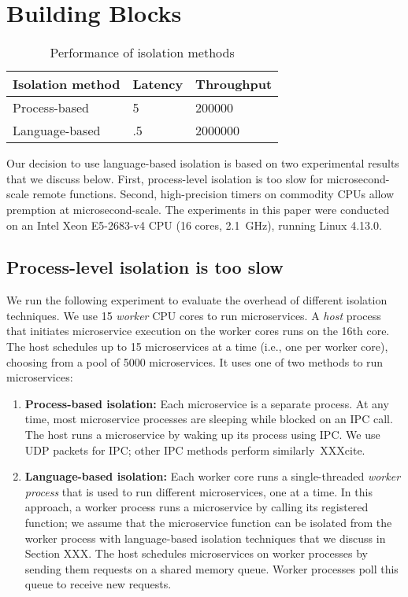 \section{Building Blocks}
\label{sec:motive}

\begin{table}
\begin{center}
\small
\begin{tabular}{lll}
\textbf{Isolation method} & \textbf{Latency} & \textbf{Throughput} \\
\midrule
Process-based & 5 & 200000 \\
Language-based & .5 & 2000000 \\
\end{tabular}
\caption{Performance of isolation methods}
\label{tab:isolation_methods}
\end{center}
\end{table}

Our decision to use language-based isolation is based on two experimental
results that we discuss below. First, process-level isolation is too slow for
microsecond-scale remote functions. Second, high-precision timers on commodity
CPUs allow premption at microsecond-scale. The experiments in this paper were
conducted on an Intel Xeon E5-2683-v4 CPU (16 cores, 2.1~GHz), running
Linux 4.13.0.

\subsection{Process-level isolation is too slow}
We run the following experiment to evaluate the overhead of different isolation
techniques. We use 15 \emph{worker} CPU cores to run microservices. A \emph{host}
process that initiates microservice execution on the worker cores runs on the
16th core. The host schedules up to 15 microservices at a time (i.e., one
per worker core), choosing from a pool of 5000 microservices. It uses one of two
methods to run microservices:

\begin{enumerate}
\item \textbf{Process-based isolation:} Each microservice is a separate process.
At any time, most microservice processes are sleeping while blocked on an IPC
call. The host runs a microservice by waking up its process using IPC. We use
UDP packets for IPC; other IPC methods perform similarly~XXXcite.
\item \textbf{Language-based isolation:} Each worker core runs a single-threaded
\emph{worker process} that is used to run different microservices, one at a time.
In this approach, a worker process runs a microservice by calling its registered
function; we assume that the microservice function can be isolated from the
worker process with language-based isolation techniques that we discuss in
Section XXX. The host schedules microservices on worker processes by sending them
requests on a shared memory queue. Worker processes poll this queue to receive
new requests.
\end{enumerate}

